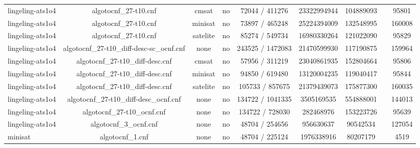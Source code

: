 \begin{appendices}
\begin{table}[p]
\begin{center}
\begin{tabular}{l|cccccccc}
  lingeling-ats1o4               & algotocnf\_27-t10.cnf          & cmsat      & no    & 72044 / 411276 & 23322994944 & 104889093 &            & 95801 \\ %
  lingeling-ats1o4               & algotocnf\_27-t10.cnf          & minisat    & no    & 73897 / 465248 & 25224394009 & 132548995 &            & 160008 \\ %
  lingeling-ats1o4               & algotocnf\_27-t10.cnf          & satelite   & no    & 85274 / 549734 & 16980330264 & 121022090 &            & 95829 \\ %
  lingeling-ats1o4               & algotocnf\_27-t10\_diff-desc-sc\_ocnf.cnf & none       & no    & 243525 / 1472083 & 21470599930 & 117190875 &            & 159964 \\ %
  lingeling-ats1o4               & algotocnf\_27-t10\_diff-desc.cnf & cmsat      & no    & 57956 / 311219 & 23040861935 & 152804664 &            & 95806 \\ %
  lingeling-ats1o4               & algotocnf\_27-t10\_diff-desc.cnf & minisat    & no    & 94850 / 619480 & 13120004235 & 119040417 &            & 95844 \\ %
  lingeling-ats1o4               & algotocnf\_27-t10\_diff-desc.cnf & satelite   & no    & 105733 / 857675 & 21379439073 & 175877300 &            & 160035 \\ %
  lingeling-ats1o4               & algotocnf\_27-t10\_diff-desc\_ocnf.cnf & none       & no    & 134722 / 1041335 & 3505169535 & 554888001 &            & 144013 \\ %
  lingeling-ats1o4               & algotocnf\_27-t10\_ocnf.cnf    & none       & no    & 134722 / 728030 & 282468976 & 153223726 &            & 95639 \\ %
  lingeling-ats1o4               & algotocnf\_3\_ocnf.cnf         & none       & no    & 48704 / 254656 & 956630637 & 90542534  &            & 127054 \\ %
  minisat                        & algotocnf\_1.cnf               & none       & no    & 48704 / 225124 & 1976338916 & 80207179  &            & 4519 \\ %

\end{tabular}
\end{center}
\end{table}
\end{appendices}
